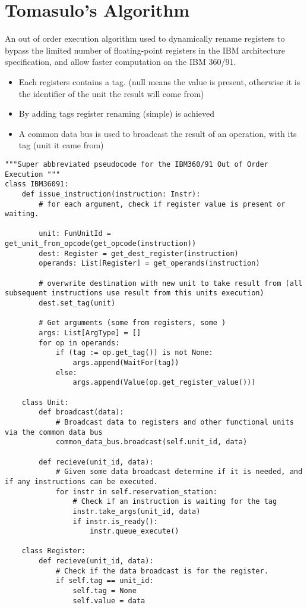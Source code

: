 \section{Tomasulo's Algorithm}
An out of order execution algorithm used to dynamically rename registers to bypass the limited number of floating-point registers in the IBM architecture specification, and allow faster computation on the IBM 360/91.
\begin{itemize}
    \item Each registers contains a tag. (null means the value is present, otherwise it is the identifier of the unit the result will come from)
    \item By adding tags register renaming (simple) is achieved
    \item A common data bus is used to broadcast the result of an operation, with its tag (unit it came from)
\end{itemize}
\begin{verbatim}
"""Super abbreviated pseudocode for the IBM360/91 Out of Order Execution """
class IBM36091:
    def issue_instruction(instruction: Instr):
        # for each argument, check if register value is present or waiting.

        unit: FunUnitId = get_unit_from_opcode(get_opcode(instruction))
        dest: Register = get_dest_register(instruction)
        operands: List[Register] = get_operands(instruction)

        # overwrite destination with new unit to take result from (all subsequent instructions use result from this units execution)
        dest.set_tag(unit)
        
        # Get arguments (some from registers, some )
        args: List[ArgType] = []
        for op in operands:
            if (tag := op.get_tag()) is not None:
                args.append(WaitFor(tag))
            else:
                args.append(Value(op.get_register_value()))
    
    class Unit:
        def broadcast(data):
            # Broadcast data to registers and other functional units via the common data bus
            common_data_bus.broadcast(self.unit_id, data)
        
        def recieve(unit_id, data):
            # Given some data broadcast determine if it is needed, and if any instructions can be executed.
            for instr in self.reservation_station:
                # Check if an instruction is waiting for the tag
                instr.take_args(unit_id, data)
                if instr.is_ready():
                    instr.queue_execute()
    
    class Register:
        def recieve(unit_id, data):
            # Check if the data broadcast is for the register.
            if self.tag == unit_id:
                self.tag = None
                self.value = data
\end{verbatim}
